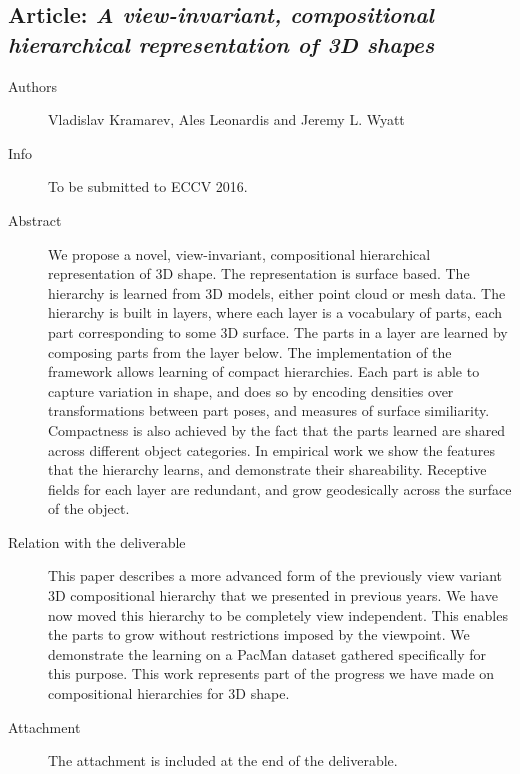 \documentclass[a4paper,11pt,pdf]{pacmanreport}
\begin{document}
\subsection{Article: \em A view-invariant, compositional hierarchical representation of 3D shapes}
\begin{description}
    \item[Authors] Vladislav Kramarev, Ales Leonardis and Jeremy L. Wyatt
    \item[Info] To be submitted to ECCV 2016.
    \item[Abstract] We propose a novel, view-invariant, compositional hierarchical representation of 3D shape. The representation is surface based. The hierarchy is learned from 3D models, either point cloud or mesh data. The hierarchy is built in layers, where each layer is a vocabulary of parts, each part corresponding to some 3D surface. The parts in a layer are learned by composing parts from the layer below. The implementation of the framework allows learning of compact hierarchies. Each part is able to capture variation in shape, and does so by encoding densities over transformations between part poses, and measures of surface similiarity. Compactness is also achieved by the fact that the parts learned are shared across different object categories. In empirical work we show the features that the hierarchy learns, and demonstrate their shareability. Receptive fields for each layer are redundant, and grow geodesically across the surface of the object.
    \item [Relation with the deliverable] This paper describes a more advanced form of the previously view variant 3D compositional hierarchy that we presented in previous years. We have now moved this hierarchy to be completely view independent. This enables the parts to grow without restrictions imposed by the viewpoint. We demonstrate the learning on a PacMan dataset gathered specifically for this purpose. This work represents part of the progress we have made on compositional hierarchies for 3D shape.
    \item[Attachment] The attachment is included at the end of the deliverable. %
\end{description}
\newpage
\end{document}
